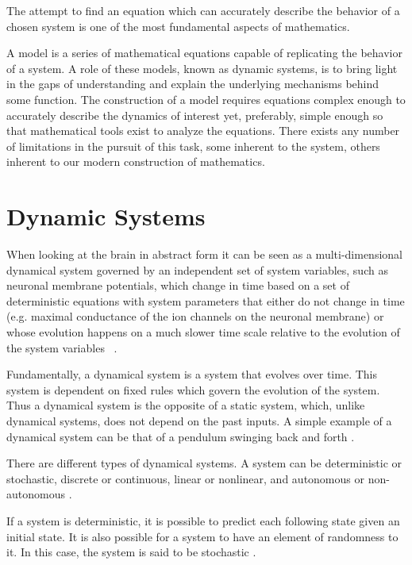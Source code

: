 \documentclass[../../Orator.tex]{subfiles}
\begin{document}
The attempt to find an equation which can accurately describe the behavior of a chosen system is one of the most fundamental aspects of mathematics.

A model is a series of mathematical equations capable of replicating the behavior of a system. A role of these models, known as dynamic systems, is to bring light in the gaps of understanding and explain the underlying mechanisms behind some function. 
The construction of a model requires equations complex enough to accurately describe the dynamics of interest yet, preferably, simple enough so that mathematical tools exist to analyze the equations\footnotemark. 
There exists any number of limitations in the pursuit of this task, some inherent to the system, others inherent to our modern construction of mathematics.

\section{Dynamic Systems}

When looking at the brain in abstract form it can be seen as a multi-dimensional dynamical system governed by an independent set of system variables, such as neuronal membrane potentials, which change in time based on a set of deterministic equations with system parameters that either do not change in time (e.g. maximal conductance of the ion
channels on the neuronal membrane) or whose evolution happens on a much slower time scale relative to the evolution of the system variables ~\cite{STEFANESCU2012748}.

Fundamentally, a dynamical system is a system that evolves over time. This system is dependent on fixed rules which govern the evolution of the system. Thus a dynamical system is the opposite of a static system, which, unlike dynamical systems, does not depend on the past inputs. A simple example of a dynamical system can be that of a pendulum swinging back and forth \cite{}. 

There are different types of dynamical systems. A system can be deterministic or stochastic, discrete or continuous, linear or nonlinear, and autonomous or non-autonomous \cite{}. 

If a system is deterministic, it is possible to predict each following state given an initial state. It is also possible for a system to have an element of randomness to it. In this case, the system is said to be stochastic \cite{}. 
\end{document}
